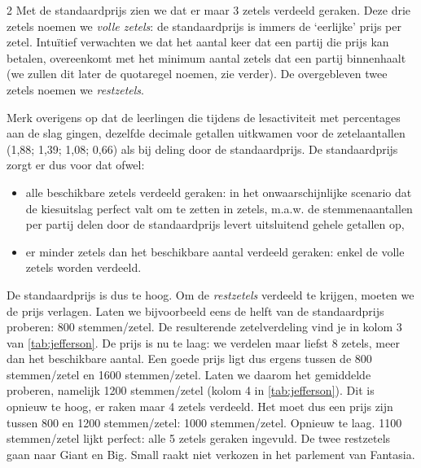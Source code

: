 \begin{multicols}{2}
Met de standaardprijs zien we dat er maar 3 zetels verdeeld geraken. Deze drie zetels noemen we \emph{volle zetels}: de standaardprijs is immers de `eerlijke' prijs per zetel. Intuïtief verwachten we dat het aantal keer dat een partij die prijs kan betalen,  overeenkomt met het minimum aantal zetels dat een partij binnenhaalt (we zullen dit later de quotaregel noemen, zie verder). De overgebleven twee zetels noemen we \emph{restzetels}.

Merk overigens op dat de leerlingen die tijdens de lesactiviteit met percentages aan de slag gingen, dezelfde decimale getallen uitkwamen voor de zetelaantallen (1,88; 1,39; 1,08; 0,66) als bij deling door de standaardprijs.  De standaardprijs zorgt er dus voor dat ofwel:
\begin{itemize}
    \item alle beschikbare zetels verdeeld geraken: in het onwaarschijnlijke scenario dat de kiesuitslag perfect valt om te zetten in zetels, m.a.w. de stemmenaantallen per partij delen door de standaardprijs levert uitsluitend gehele getallen op,
    \item er minder zetels dan het beschikbare aantal verdeeld geraken: enkel de volle zetels worden verdeeld.
\end{itemize}

De standaardprijs is dus te hoog. Om de \emph{restzetels} verdeeld te krijgen, moeten we de prijs verlagen. Laten we bijvoorbeeld eens de helft van de standaardprijs proberen: 800 stemmen/zetel. De resulterende zetelverdeling vind je in kolom 3 van \autoref{tab:jefferson}. De prijs is nu te laag: we verdelen maar liefst 8 zetels, meer dan het beschikbare aantal. Een goede prijs ligt dus ergens tussen de 800 stemmen/zetel en 1600 stemmen/zetel. Laten we daarom het gemiddelde proberen, namelijk 1200 stemmen/zetel (kolom 4 in \autoref{tab:jefferson}). Dit is opnieuw te hoog, er raken maar 4 zetels verdeeld. Het moet dus een prijs zijn tussen 800 en 1200 stemmen/zetel: 1000 stemmen/zetel. Opnieuw te laag. 1100 stemmen/zetel lijkt perfect: alle 5 zetels geraken ingevuld. De twee restzetels gaan naar Giant en Big. Small raakt niet verkozen in het parlement van Fantasia. 


\end{multicols}
